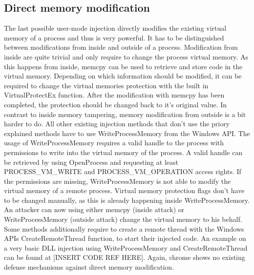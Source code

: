 \subsection{Direct memory modification}
The last possible user-mode injection directly modifies the existing virtual memory of a process and thus is very powerful. It has to be distinguished between modifications from inside and outside of a process. Modification from inside are quite trivial and only require to change the process virtual memory. As this happens from inside, memcpy can be used to retrieve and store code in the virtual memory. Depending on which information should be modified, it can be required to change the virtual memories protection with the built in VirtualProtectEx function. After the modification with memcpy has been completed, the protection should be changed back to it's original value. In contrast to inside memory tampering, memory modification from outside is a bit harder to do. All other existing injection methods that don't use the priory explained methods have to use WriteProcessMemory from the Windows API. The usage of WriteProcessMemory requires a valid handle to the process with permissions to write into the virtual memory of the process. A valid handle can be retrieved by using OpenProcess and requesting at least PROCESS\_VM\_WRITE and PROCESS\_VM\_OPERATION access rights. If the permissions are missing, WriteProcessMemory is not able to modify the virtual memory of a remote process. Virtual memory protection flags don't have to be changed manually, as this is already happening inside WriteProcessMemory. An attacker can now using either memcpy (inside attack) or WriteProcessMemory (outside attack) change the virtual memory to his behalf. Some methods additionally require to create a remote thread with the Windows APIs CreateRemoteThread function, to start their injected code. An example on a very basic DLL injection using WriteProcessMemory and CreateRemoteThread can be found at [INSERT CODE REF HERE]. Again, chrome shows no existing defense mechanisms against direct memory modification.
